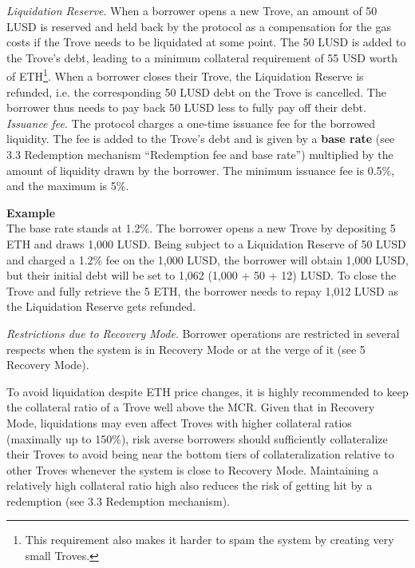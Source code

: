 \documentclass{article}
\begin{document}
\textit{Liquidation Reserve}. When a borrower opens a new Trove, an amount of 50 LUSD is reserved and held back by the protocol as a compensation for the gas costs if the Trove needs to be liquidated at some point. The 50 LUSD is added to the Trove's debt, leading to a minimum collateral requirement of 55 USD worth of ETH\footnote{This requirement also makes it harder to spam the system by creating very small Troves.}. When a borrower closes their Trove, the Liquidation Reserve is refunded, i.e. the corresponding 50 LUSD debt on the Trove is cancelled. The borrower thus needs to pay back 50 LUSD less to fully pay off their debt. \\

\textit{Issuance fee}.   The protocol charges a one-time issuance fee for the borrowed liquidity. The fee is added to the Trove's debt and is given by a \textbf{base rate} (see 3.3 Redemption mechanism “Redemption fee and base rate”) multiplied by the amount of liquidity drawn by the borrower. The minimum issuance fee is 0.5\%, and the maximum is 5\%. \\

\begin{tcolorbox}
\textbf{Example}\\
The base rate stands at 1.2\%. The borrower opens a new Trove by depositing 5 ETH and draws 1,000 LUSD. Being subject to a Liquidation Reserve of 50 LUSD and charged a 1.2\% fee on the 1,000 LUSD, the borrower will obtain 1,000 LUSD, but their initial debt will be set to 1,062 (1,000 + 50 + 12) LUSD. To close the Trove and fully retrieve the 5 ETH, the borrower needs to repay 1,012 LUSD as the Liquidation Reserve gets refunded.
\end{tcolorbox}

\textit{Restrictions due to Recovery Mode}.   Borrower operations are restricted in several respects when the system is in Recovery Mode or at the verge of it (see 5 Recovery Mode). 

To avoid liquidation despite ETH price changes, it is highly recommended to keep the collateral ratio of a Trove well above the MCR. Given that in Recovery Mode, liquidations may even affect Troves with higher collateral ratios (maximally up to 150\%), risk averse borrowers should sufficiently collateralize their Troves to avoid being near the bottom tiers of collateralization relative to other Troves whenever the system is close to Recovery Mode. Maintaining a relatively high collateral ratio high also reduces the risk of getting hit by a redemption (see 3.3 Redemption mechanism).
\end{document}
